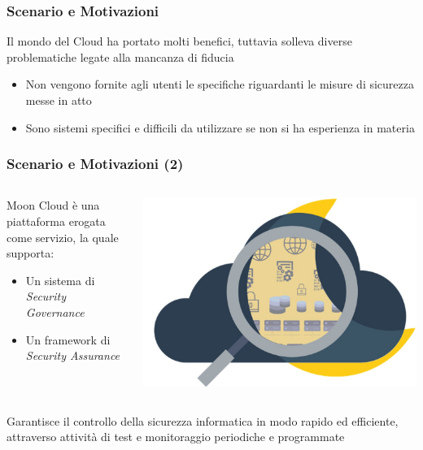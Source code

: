 \frame{\titlepage}

\begin{frame}
    \frametitle{Scenario e Motivazioni}
    Il mondo del Cloud ha portato molti benefici, tuttavia solleva diverse problematiche legate alla \alert{mancanza di fiducia}
    \hfill\break
    \begin{itemize}
        \item Non vengono fornite agli utenti le specifiche riguardanti le misure di sicurezza messe in atto
        \item Sono sistemi specifici e \alert{difficili da utilizzare} se non si ha esperienza in materia
    \end{itemize}
\end{frame}

\begin{frame}
    \frametitle{Scenario e Motivazioni (2)}
    \begin{columns}
        \begin{column}{0.55\textwidth}
            Moon Cloud è una piattaforma erogata come servizio, la quale supporta:
            \begin{itemize}
                \item Un sistema di \textit{Security Governance}
                \item Un framework di \alert{\textit{Security Assurance}}
            \end{itemize}
        \end{column}
        \begin{column}{0.4\textwidth}
            \begin{center}
                \includegraphics[scale=0.12]{images/mc}
            \end{center}
        \end{column}
    \end{columns}
    Garantisce il controllo della sicurezza informatica in modo rapido ed efficiente, attraverso attività di test e monitoraggio 
    periodiche e programmate
\end{frame}

